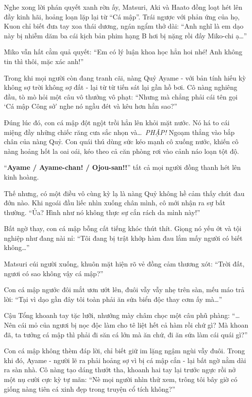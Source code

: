 \documentclass[../main.tex]{subfiles}
\begin{document}
Nghe xong lời phán quyết xanh rờn ấy, Matsuri, Aki và Haato đồng loạt hét lên đầy kinh hãi, hoảng loạn lặp lại từ ``Cá mập''. Trái ngược với phản ứng của họ, Kuon chỉ biết đưa tay xoa thái dương, ngán ngẩm thở dài:
``Anh nghĩ là em dạo này bị nhiễm dăm ba cái kịch bản phim hạng B hơi bị nặng rồi đấy Miko-chi ạ\dots''

Miko vẫn hất cằm quả quyết:
``Em có lý luận khoa học hẳn hoi nhé! Anh không tin thì thôi, mặc xác anh!''

Trong khi mọi người còn đang tranh cãi, nàng Quỷ Ayame - với bản tính hiếu kỳ không sợ trời không sợ đất - lại từ từ tiến sát lại gần hồ bơi. Cô nàng nghiêng đầu, tò mò hỏi một câu vô thưởng vô phạt:
``Nhưng mà chẳng phải cái tên gọi `Cá mập Công sở' nghe nó ngầu đét và kêu hơn hẳn sao?''

Đúng lúc đó, con cá mập đột ngột trồi hẳn lên khỏi mặt nước. Nó há to cái miệng đầy những chiếc răng cưa sắc nhọn và\dots\ \textit{PHẬP!} Ngoạm thẳng vào bắp chân của nàng Quỷ. Con quái thú dùng sức kéo mạnh cô xuống nước, khiến cô nàng hoảng hốt la oai oái, kéo theo cả căn phòng rơi vào cảnh náo loạn tột độ.


``\textbf{Ayame / Ayame-chan! / Ojou-san!!}'' tất cả mọi người đồng thanh hét lên kinh hoàng.

Thế nhưng, có một điều vô cùng kỳ lạ là nàng Quỷ không hề cảm thấy chút đau đớn nào. Khi ngoái đầu liếc nhìn xuống chân mình, cô mới nhận ra sự bất thường.
``Ủa? Hình như nó không thực sự cắn rách da mình này!''

Bất ngờ thay, con cá mập bỗng cất tiếng khóc thút thít. Giọng nó yếu ớt và tội nghiệp như đang nài nỉ:
``Tôi đang bị trật khớp hàm đau lắm mấy người có biết không\dots''

Matsuri cúi người xuống, khuôn mặt hiện rõ vẻ đồng cảm thương xót:
``Trời đất, ngươi có sao không vậy cá mập?''

Con cá mập ngước đôi mắt ươn ướt lên, đuôi vẫy vẫy nhẹ trên sàn, mếu máo trả lời:
``Tại vì dạo gần đây tôi toàn phải ăn sứa biển độc thay cơm ấy mà\dots''

Cậu Tổng khoanh tay tặc lưỡi, nhướng mày châm chọc một câu phũ phàng:
``\dots Nên cái mỏ của ngươi bị nọc độc làm cho tê liệt hết cả hàm rồi chứ gì? Mà khoan đã, ta tưởng cá mập thì phải đi săn cá lớn mà ăn chứ, đi ăn sứa làm cái quái gì?''

Con cá mập không thèm đáp lời, chỉ biết giữ im lặng ngậm ngùi vẫy đuôi. Trong khi đó, Ayame - người lẽ ra phải hoảng sợ vì bị cá mập cắn - lại bất ngờ nằm dài ra sàn nhà. Cô nàng tạo dáng thướt tha, khoanh hai tay lại trước ngực rồi nở một nụ cười cực kỳ tự mãn:
``Nè mọi người nhìn thử xem, trông tôi bây giờ có giống nàng tiên cá xinh đẹp trong truyện cổ tích không?''
\end{document}
